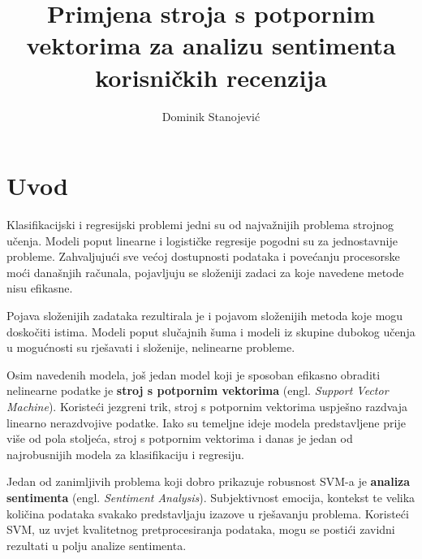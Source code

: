 \documentclass[times, utf8, zavrsni, numeric]{fer}
\begin{document}

\title{Primjena stroja s potpornim vektorima za analizu sentimenta korisničkih recenzija}

\author{Dominik Stanojević}

\maketitle

\izvornik


\tableofcontents

\chapter{Uvod}

\par Klasifikacijski i regresijski problemi jedni su od najvažnijih problema strojnog učenja. 
Modeli poput linearne i logističke regresije pogodni su za jednostavnije probleme.
Zahvaljujući sve većoj dostupnosti podataka i povećanju procesorske moći današnjih računala,
pojavljuju se složeniji zadaci za koje navedene metode nisu efikasne.

\par Pojava složenijih zadataka rezultirala je i pojavom složenijih metoda koje mogu doskočiti 
istima. Modeli poput slučajnih šuma i modeli iz skupine dubokog učenja u mogućnosti su rješavati i složenije, 
nelinearne probleme.

\par Osim navedenih modela, još jedan model koji je sposoban efikasno obraditi nelinearne podatke 
je \textbf{stroj s potpornim vektorima} (engl. \textit{Support Vector Machine}).
Koristeći jezgreni trik, stroj s potpornim vektorima uspješno razdvaja linearno nerazdvojive podatke.
Iako su temeljne ideje modela predstavljene prije više od pola stoljeća, stroj s potpornim vektorima i danas je jedan od
najrobusnijih modela za klasifikaciju i regresiju.

\par Jedan od zanimljivih problema koji dobro prikazuje robusnost SVM-a je \textbf{analiza sentimenta}
(engl. \textit{Sentiment Analysis}).
Subjektivnost emocija, kontekst te velika količina podataka svakako predstavljaju izazove u rješavanju problema.
Koristeći SVM, uz uvjet kvalitetnog pretprocesiranja podataka, mogu se postići zavidni rezultati u polju analize sentimenta.
\end{document}
